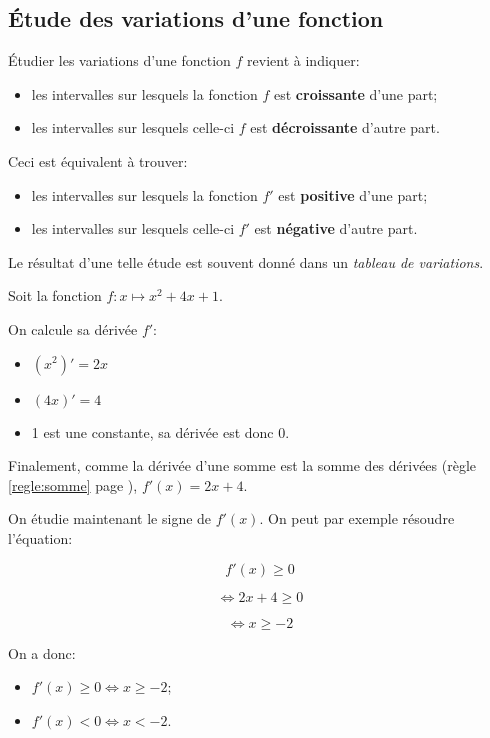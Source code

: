 \documentclass[a4paper,12pt]{scrartcl}
\begin{document}
\subsection{Étude des variations d'une fonction}

Étudier les variations d'une fonction $f$ revient à indiquer: 

\begin{itemize}
 \item les intervalles sur lesquels la fonction $f$ est \textbf{croissante} d'une part;
 \item les intervalles sur lesquels celle-ci $f$ est \textbf{décroissante} d'autre part. 
\end{itemize}

Ceci est équivalent à trouver: 

\begin{itemize}
 \item les intervalles sur lesquels la fonction $f'$ est \textbf{positive} d'une part;
 \item les intervalles sur lesquels celle-ci $f'$ est \textbf{négative} d'autre part. 
\end{itemize}

Le résultat d'une telle étude est souvent donné dans un \emph{tableau de variations}. 

\exemple{}
Soit la fonction $f : x \longmapsto x^2 + 4x + 1$.

On calcule sa dérivée $f'$:

\begin{itemize}
 \item $(x^2)' = 2x$
 \item $(4x)' = 4$
 \item 1 est une constante, sa dérivée est donc 0.
\end{itemize}

Finalement, comme la dérivée d'une somme est la somme des dérivées (règle \ref{regle:somme} page \pageref{regle:somme}), $f'(x) = 2x + 4$. 

On étudie maintenant le signe de $f'(x)$. On peut par exemple résoudre l'équation:

\begin{equation*}
 f'(x) \geqslant 0
\end{equation*}

$$\Leftrightarrow 2x + 4 \geqslant 0$$

$$\Leftrightarrow x \geqslant -2$$

On a donc: 

\begin{itemize}
 \item $f'(x) \geqslant 0 \Leftrightarrow x  \geqslant -2$;
 \item $f'(x) < 0 \Leftrightarrow x  < -2$.
\end{itemize}
\end{document}
